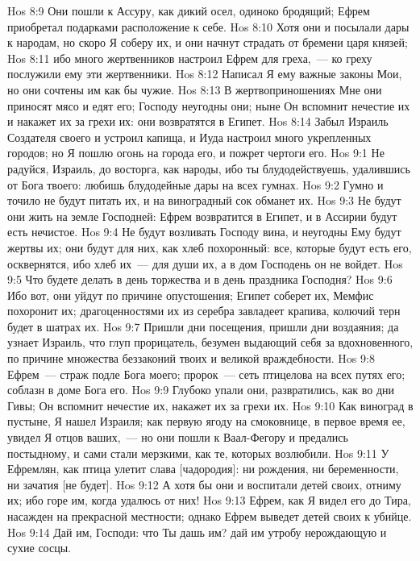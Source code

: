 \vs Hos 8:9 Они пошли к Ассуру, как дикий осел, одиноко бродящий; Ефрем приобретал подарками расположение к себе.
\vs Hos 8:10 Хотя они и посылали дары к народам, но скоро Я соберу их, и они начнут страдать от бремени царя князей;
\vs Hos 8:11 ибо много жертвенников настроил Ефрем для греха,~--- ко греху послужили ему эти жертвенники.
\vs Hos 8:12 Написал Я ему важные законы Мои, но они сочтены им как бы чужие.
\vs Hos 8:13 В жертвоприношениях Мне они приносят мясо и едят его; Господу неугодны они; ныне Он вспомнит нечестие их и накажет их за грехи их: они возвратятся в Египет.
\vs Hos 8:14 Забыл Израиль Создателя своего и устроил капища, и Иуда настроил много укрепленных городов; но Я пошлю огонь на города его, и пожрет чертоги его.
\vs Hos 9:1 Не радуйся, Израиль, до восторга, как  народы, ибо ты блудодействуешь, удалившись от Бога твоего: любишь блудодейные дары на всех гумнах.
\vs Hos 9:2 Гумно и точило не будут питать их, и  на виноградный сок обманет их.
\vs Hos 9:3 Не будут они жить на земле Господней: Ефрем возвратится в Египет, и в Ассирии будут есть нечистое.
\vs Hos 9:4 Не будут возливать Господу вина, и неугодны Ему будут жертвы их; они будут для них, как хлеб похоронный: все, которые будут есть его, осквернятся, ибо хлеб их~--- для души их, а в дом Господень он не войдет.
\vs Hos 9:5 Что будете делать в день торжества и в день праздника Господня?
\vs Hos 9:6 Ибо вот, они уйдут по причине опустошения; Египет соберет их, Мемфис похоронит их; драгоценностями их из серебра завладеет крапива, колючий терн будет в шатрах их.
\vs Hos 9:7 Пришли дни посещения, пришли дни воздаяния; да узнает Израиль, что глуп прорицатель, безумен выдающий себя за вдохновенного, по причине множества беззаконий твоих и великой враждебности.
\vs Hos 9:8 Ефрем~--- страж подле Бога моего; пророк~--- сеть птицелова на всех путях его; соблазн в доме Бога его.
\vs Hos 9:9 Глубоко упали они, развратились, как во дни Гивы; Он вспомнит нечестие их, накажет их за грехи их.
\vs Hos 9:10 Как виноград в пустыне, Я нашел Израиля; как первую ягоду на смоковнице, в первое время ее, увидел Я отцов ваших,~--- но они пошли к Ваал-Фегору и предались постыдному, и сами стали мерзкими, как те, которых возлюбили.
\vs Hos 9:11 У Ефремлян, как птица улетит слава [чадородия]: ни рождения, ни беременности, ни зачатия [не будет].
\vs Hos 9:12 А хотя бы они и воспитали детей своих, отниму их; ибо горе им, когда удалюсь от них!
\vs Hos 9:13 Ефрем, как Я видел его до Тира, насажден на прекрасной местности; однако Ефрем выведет детей своих к убийце.
\vs Hos 9:14 Дай им, Господи: что Ты дашь им? дай им утробу нерождающую и сухие сосцы.
